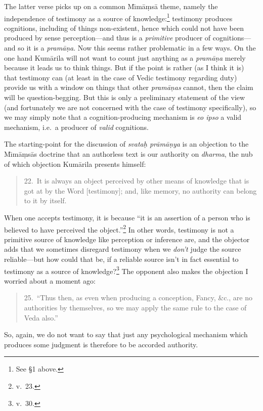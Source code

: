 ﻿\documentclass[11pt]{amsart}
\begin{document}
The latter verse picks up on a common M\={\i}m\=a\d ms\=a theme, namely the independence of testimony as a source of knowledge:\footnote{See \S1 above.} testimony produces cognitions, including of things non-existent, hence which could not have been produced by sense perception---and thus is a \emph{primitive} producer of cognitions---and so it is a \emph{pram\=a\d na}. Now this seems rather problematic in a few ways. On the one hand Kum\=arila will not want to count just anything as a \emph{pram\=a\d na} merely because it leads us to think things. But if the point is rather (as I think it is) that testimony can (at least in the case of Vedic testimony regarding duty) provide us with a window on things that other \emph{pram\=a\d nas} cannot, then the claim will be question-begging. But this is only a preliminary statement of the view (and fortunately we are not concerned with the case of testimony specifically), so we may simply note that a cognition-producing mechanism is \emph{eo ipso} a valid mechanism, i.e.~a producer of \emph{valid} cognitions.

The starting-point for the discussion of \emph{svata\d h pr\=am\=a\d nya} is an objection to the M\={\i}m\=a\d ms\=as doctrine that an authorless text is our authority on \emph{dharma}, the nub of which objection Kum\=arila presents himself:\small\begin{quote}22.~It is always an object perceived by other means of knowledge that is got at by the Word [testimony]; and, like memory, no authority can belong to it by itself.\end{quote}\normalsize When one accepts testimony, it is because ``it is an assertion of a person who is believed to have perceived the object.''\footnote{v.~23.} In other words, testimony is not a primitive source of knowledge like perception or inference are, and the objector adds that we sometimes disregard testimony when we \emph{don't} judge the source reliable---but how could that be, if a reliable source isn't in fact essential to testimony as a source of knowledge?\footnote{v.~30.} The opponent also makes the objection I worried about a moment ago:\small\begin{quote}25.~``Thus then, as even when producing a conception, Fancy, \&c., are no authorities by themselves, so we may apply the same rule to the case of Veda also.''\end{quote}\normalsize So, again, we do not want to say that just any psychological mechanism which produces some judgment is therefore to be accorded authority.
\end{document}
